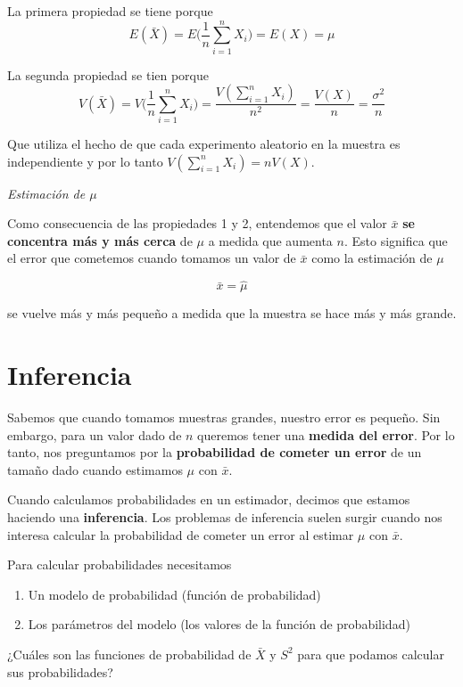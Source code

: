 \documentclass[
]{book}
\begin{document}
La primera propiedad se tiene porque
\[E(\bar{X})=E\big(\frac{1}{n}\sum_{i=1}^n X_i\big)=E(X)=\mu\]

La segunda propiedad se tien porque
\[V(\bar{X})=V\big(\frac{1}{n}\sum_{i=1}^n X_i\big)=\frac{V(\sum_{i=1}^ nX_i)}{n^2}=\frac{V(X)}{n}=\frac{\sigma^2}{n}\]

Que utiliza el hecho de que cada experimento aleatorio en la muestra es independiente y por lo tanto \(V(\sum_{i=1}^n X_i)=nV(X)\).

\emph{Estimación de \(\mu\)}

Como consecuencia de las propiedades 1 y 2, entendemos que el valor \(\bar{x}\) \textbf{se concentra más y más cerca} de \(\mu\) a medida que aumenta \(n\). Esto significa que el error que cometemos cuando tomamos un valor de \(\bar{x}\) como la estimación de \(\mu\)

\[\bar{x}=\hat{\mu}\]

se vuelve más y más pequeño a medida que la muestra se hace más y más grande.

\hypertarget{inferencia}{%
\section{Inferencia}\label{inferencia}}

Sabemos que cuando tomamos muestras grandes, nuestro error es pequeño. Sin embargo, para un valor dado de \(n\) queremos tener una \textbf{medida del error}. Por lo tanto, nos preguntamos por la \textbf{probabilidad de cometer un error} de un tamaño dado cuando estimamos \(\mu\) con \(\bar{x}\).

Cuando calculamos probabilidades en un estimador, decimos que estamos haciendo una \textbf{inferencia}. Los problemas de inferencia suelen surgir cuando nos interesa calcular la probabilidad de cometer un error al estimar \(\mu\) con \(\bar{x}\).

Para calcular probabilidades necesitamos

\begin{enumerate}
\def\labelenumi{\arabic{enumi}.}
\item
  Un modelo de probabilidad (función de probabilidad)
\item
  Los parámetros del modelo (los valores de la función de probabilidad)
\end{enumerate}

¿Cuáles son las funciones de probabilidad de \(\bar{X}\) y \(S^2\) para que podamos calcular sus probabilidades?
\end{document}

